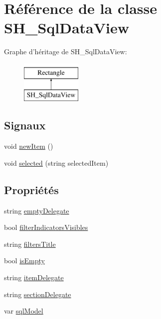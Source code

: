 \hypertarget{classSH__SqlDataView}{\section{Référence de la classe S\-H\-\_\-\-Sql\-Data\-View}
\label{classSH__SqlDataView}
}
Graphe d'héritage de S\-H\-\_\-\-Sql\-Data\-View\-:\begin{figure}[H]
\begin{center}
\leavevmode
\includegraphics[height=2.000000cm]{classSH__SqlDataView}
\end{center}
\end{figure}
\subsection*{Signaux}
\begin{DoxyCompactItemize}
\item 
void \hyperlink{classSH__SqlDataView_a8ce529551e776f86ee76d29da47f9914}{new\-Item} ()
\item 
void \hyperlink{classSH__SqlDataView_a95366e3f65b183e8c82381e90b5ddc94}{selected} (string selected\-Item)
\end{DoxyCompactItemize}
\subsection*{Propriétés}
\begin{DoxyCompactItemize}
\item 
string \hyperlink{classSH__SqlDataView_af2c0c75bb57606451699027fa74eeda2}{empty\-Delegate}
\item 
bool \hyperlink{classSH__SqlDataView_afdc0805dc2ce3af4e9ce5331a81d7e13}{filter\-Indicators\-Visibles}
\item 
string \hyperlink{classSH__SqlDataView_a96eb074075b9ba561603a081992a1cfc}{filters\-Title}
\item 
bool \hyperlink{classSH__SqlDataView_a3ceaf016d4dace986a92e2e77772bac9}{is\-Empty}
\item 
string \hyperlink{classSH__SqlDataView_a7ae6767ae8a82bd33b942c774c534a33}{item\-Delegate}
\item 
string \hyperlink{classSH__SqlDataView_a60486947b034f5fca72a2d5775ad1767}{section\-Delegate}
\item 
var \hyperlink{classSH__SqlDataView_ad538d6f1dd43a7d01c7960a74ca131dc}{sql\-Model}
\end{DoxyCompactItemize}


